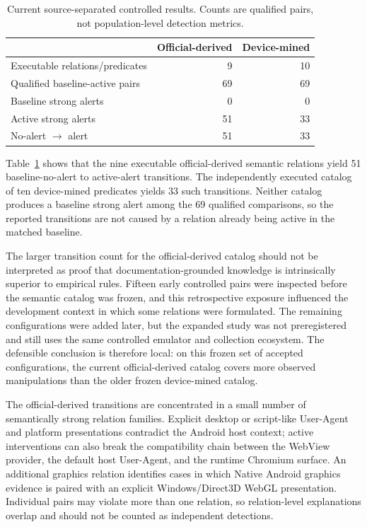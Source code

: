 \begin{table}[t]
\caption{Current source-separated controlled results. Counts are qualified pairs, not population-level detection metrics.}
\label{tab:current-source-results}
\small
\begin{tabular}{@{}lrr@{}}
\toprule
 & Official-derived & Device-mined \\
\midrule
Executable relations/predicates & 9 & 10 \\
Qualified baseline-active pairs & 69 & 69 \\
Baseline strong alerts & 0 & 0 \\
Active strong alerts & 51 & 33 \\
No-alert $\rightarrow$ alert & 51 & 33 \\
\bottomrule
\end{tabular}
\end{table}

Table~\ref{tab:current-source-results} shows that the nine executable official-derived semantic relations yield 51 baseline-no-alert to active-alert transitions. The independently executed catalog of ten device-mined predicates yields 33 such transitions. Neither catalog produces a baseline strong alert among the 69 qualified comparisons, so the reported transitions are not caused by a relation already being active in the matched baseline.

The larger transition count for the official-derived catalog should not be interpreted as proof that documentation-grounded knowledge is intrinsically superior to empirical rules. Fifteen early controlled pairs were inspected before the semantic catalog was frozen, and this retrospective exposure influenced the development context in which some relations were formulated. The remaining configurations were added later, but the expanded study was not preregistered and still uses the same controlled emulator and collection ecosystem. The defensible conclusion is therefore local: on this frozen set of accepted configurations, the current official-derived catalog covers more observed manipulations than the older frozen device-mined catalog.

The official-derived transitions are concentrated in a small number of semantically strong relation families. Explicit desktop or script-like User-Agent and platform presentations contradict the Android host context; active interventions can also break the compatibility chain between the WebView provider, the default host User-Agent, and the runtime Chromium surface. An additional graphics relation identifies cases in which Native Android graphics evidence is paired with an explicit Windows/Direct3D WebGL presentation. Individual pairs may violate more than one relation, so relation-level explanations overlap and should not be counted as independent detections.

